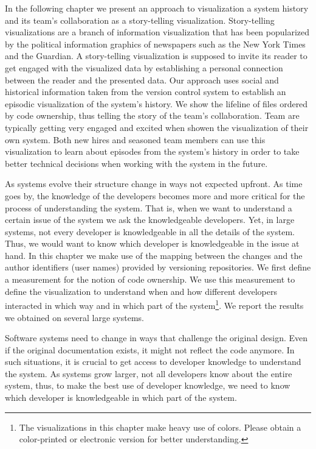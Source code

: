 In the following chapter we present an approach to visualization a system history and its team's collaboration as a story-telling visualization. Story-telling visualizations are a branch of information visualization that has been popularized by the political information graphics of newspapers such as the New York Times and the Guardian. A story-telling visualization is supposed to invite its reader to get engaged with the visualized data by establishing a personal connection between the reader and the presented data. Our approach uses social and historical information taken from the version control system to establish an episodic visualization of the system's history. We show the lifeline of files ordered by code ownership, thus telling the story of the team's collaboration. Team are typically getting very engaged and excited when showen the visualization of their own system. Both new hires and seasoned team members can use this visualization to learn about episodes from the system's history in order to take better technical decisions when working with the system in the future.

\asteriskasteriskasterisk

As systems evolve their structure change in ways not expected upfront. As time goes by, the knowledge of the developers becomes more and more critical for the process of understanding the system. That is, when we want to understand a certain issue of the system we ask the knowledgeable developers. Yet, in large systems, not every developer is knowledgeable in all the details of the system. Thus, we would want to know which developer is knowledgeable in the issue at hand. In this chapter we make use of the mapping between the changes and the author identifiers (\eg user names) provided by versioning repositories. We first define a measurement for the notion of code ownership. We use this measurement to define the \omap visualization to understand when and how different developers interacted in which way and in which part of the system\footnote{The visualizations in this chapter make heavy use of colors. Please obtain a color-printed or electronic version for better understanding.}. We report the results we obtained on several large systems.

Software systems need to change in ways that challenge the original design. Even if the original documentation exists, it might not reflect the code anymore. In such situations, it is crucial to get access to developer knowledge to understand the system. As systems grow larger, not all developers know about the entire system, thus, to make the best use of developer knowledge, we need to know which developer is knowledgeable in which part of the system.

